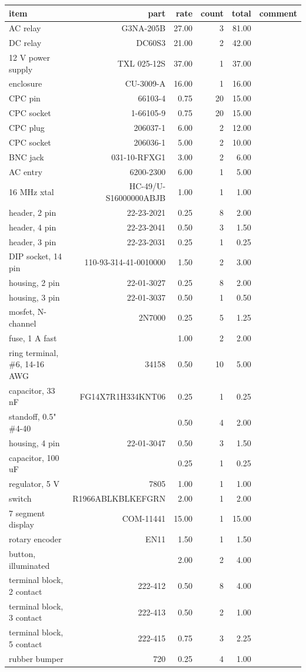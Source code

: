 \documentclass{manual}
\begin{document}
\begin{tabular}{lrrrrl}
item & part & rate & count & total & comment\\
\hline
AC relay & G3NA-205B & 27.00 & 3 & 81.00 & \\
DC relay & DC60S3 & 21.00 & 2 & 42.00 & \\
12 V power supply & TXL 025-12S & 37.00 & 1 & 37.00 & \\
enclosure & CU-3009-A & 16.00 & 1 & 16.00 & \\
CPC pin & 66103-4 & 0.75 & 20 & 15.00 & \\
CPC socket & 1-66105-9 & 0.75 & 20 & 15.00 & \\
CPC plug & 206037-1 & 6.00 & 2 & 12.00 & \\
CPC socket & 206036-1 & 5.00 & 2 & 10.00 & \\
BNC jack & 031-10-RFXG1 & 3.00 & 2 & 6.00 & \\
AC entry & 6200-2300 & 6.00 & 1 & 5.00 & \\
16 MHz xtal & HC-49/U-S16000000ABJB & 1.00 & 1 & 1.00 & \\
header, 2 pin & 22-23-2021 & 0.25 & 8 & 2.00 & \\
header, 4 pin & 22-23-2041 & 0.50 & 3 & 1.50 & \\
header, 3 pin & 22-23-2031 & 0.25 & 1 & 0.25 & \\
DIP socket, 14 pin & 110-93-314-41-0010000 & 1.50 & 2 & 3.00 & \\
housing, 2 pin & 22-01-3027 & 0.25 & 8 & 2.00 & \\
housing, 3 pin & 22-01-3037 & 0.50 & 1 & 0.50 & \\
mosfet, N-channel & 2N7000 & 0.25 & 5 & 1.25 & \\
fuse, 1 A fast &  & 1.00 & 2 & 2.00 & \\
ring terminal, \#6, 14-16 AWG & 34158 & 0.50 & 10 & 5.00 & \\
capacitor, 33 nF & FG14X7R1H334KNT06 & 0.25 & 1 & 0.25 & \\
standoff, 0.5" \#4-40 &  & 0.50 & 4 & 2.00 & \\
housing, 4 pin & 22-01-3047 & 0.50 & 3 & 1.50 & \\
capacitor, 100 uF &  & 0.25 & 1 & 0.25 & \\
regulator, 5 V & 7805 & 1.00 & 1 & 1.00 & \\
switch & R1966ABLKBLKEFGRN & 2.00 & 1 & 2.00 & \\
7 segment display & COM-11441 & 15.00 & 1 & 15.00 & \\
rotary encoder & EN11 & 1.50 & 1 & 1.50 & \\
button, illuminated &  & 2.00 & 2 & 4.00 & \\
terminal block, 2 contact & 222-412 & 0.50 & 8 & 4.00 & \\
terminal block, 3 contact & 222-413 & 0.50 & 2 & 1.00 & \\
terminal block, 5 contact & 222-415 & 0.75 & 3 & 2.25 & \\
rubber bumper & 720 & 0.25 & 4 & 1.00 & \\
\end{tabular}
\end{document}

